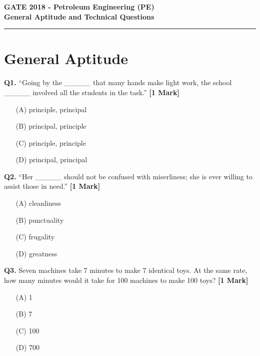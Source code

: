\documentclass[11pt]{article}
\newcommand{\questiona}[2]{
    \noindent\textbf{Q#2.} #1 \hfill \textbf{[1 Mark]}
}
\begin{document}
\begin{center}
    \Large\textbf{GATE 2018 - Petroleum Engineering (PE)} \\
    \large\textbf{General Aptitude and Technical Questions} \\
    \rule{\textwidth}{0.5pt} %
\end{center}

\vspace{0.5cm}

\section*{General Aptitude}

\questiona{“Going by the \_\_\_\_\_ that many hands make light work, the school \_\_\_\_\_ involved all the students in the task.”}{1}
\begin{enumerate}
    \item[(A)] principle, principal  
    \item[(B)] principal, principle  
    \item[(C)] principle, principle  
    \item[(D)] principal, principal  
\end{enumerate}
\vspace{0.5cm}

\questiona{“Her \_\_\_\_\_ should not be confused with miserliness; she is ever willing to assist those in need.”}{2}
\begin{enumerate}
    \item[(A)] cleanliness  
    \item[(B)] punctuality  
    \item[(C)] frugality  
    \item[(D)] greatness  
\end{enumerate}
\vspace{0.5cm}

\questiona{Seven machines take 7 minutes to make 7 identical toys. At the same rate, how many minutes would it take for 100 machines to make 100 toys?}{3}
\begin{enumerate}
    \item[(A)] 1  
    \item[(B)] 7  
    \item[(C)] 100  
    \item[(D)] 700  
\end{enumerate}
\vspace{0.5cm}
\end{document}
